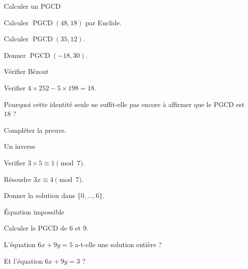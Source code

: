 \exercices
{}
\begingroup\renewcommand{\otBesoinPlace}[1]{}\begin{minipage}{\linewidth}
\begin{exercice}[1]{Calculer un PGCD}

\begin{questions}
\item Calculer $\operatorname{PGCD}(48,18)$ par Euclide.
\item Calculer $\operatorname{PGCD}(35,12)$.
\item Donner $\operatorname{PGCD}(-18,30)$.
\end{questions}
\end{exercice}
\begin{exercice}[1]{Vérifier Bézout}

\begin{questions}
\item Verifier $4\times252-5\times198=18$.
\item Pourquoi cette identité seule ne suffit-elle pas encore à affirmer que le PGCD est $18$ ?
\item Compléter la preuve.
\end{questions}
\end{exercice}
\begin{exercice}[1]{Un inverse}

\begin{questions}
\item Verifier $3\times5\equiv1\pmod7$.
\item Résoudre $3x\equiv4\pmod7$.
\item Donner la solution dans $\{0,\ldots,6\}$.
\end{questions}
\end{exercice}
\begin{exercice}[1]{Équation impossible}

\begin{questions}
\item Calculer le PGCD de $6$ et $9$.
\item L’équation $6x+9y=5$ a-t-elle une solution entière ?
\item Et l’équation $6x+9y=3$ ?
\end{questions}
\end{exercice}
\end{minipage}\endgroup
\clearpage
{}
